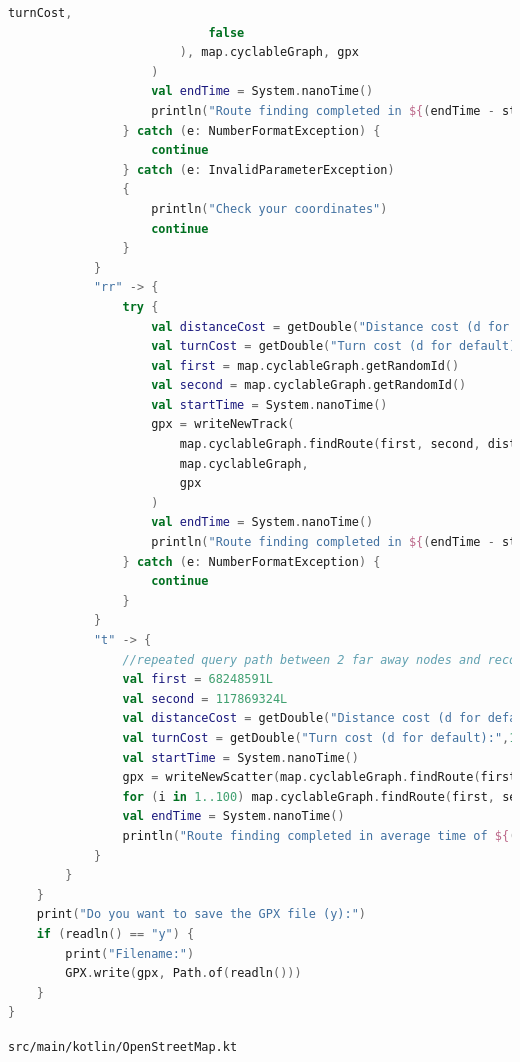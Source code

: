 \documentclass[11pt,twoside,a4paper]{report}
\begin{document}
\begin{lstlisting}[language=kotlin]
                            turnCost,
                            false
                        ), map.cyclableGraph, gpx
                    )
                    val endTime = System.nanoTime()
                    println("Route finding completed in ${(endTime - startTime) / (1000000000.0)}")
                } catch (e: NumberFormatException) {
                    continue
                } catch (e: InvalidParameterException)
                {
                    println("Check your coordinates")
                    continue
                }
            }
            "rr" -> {
                try {
                    val distanceCost = getDouble("Distance cost (d for default):",15.0)
                    val turnCost = getDouble("Turn cost (d for default):",10.0)
                    val first = map.cyclableGraph.getRandomId()
                    val second = map.cyclableGraph.getRandomId()
                    val startTime = System.nanoTime()
                    gpx = writeNewTrack(
                        map.cyclableGraph.findRoute(first, second, distanceCost, turnCost, false),
                        map.cyclableGraph,
                        gpx
                    )
                    val endTime = System.nanoTime()
                    println("Route finding completed in ${(endTime - startTime) / (1000000000.0)}")
                } catch (e: NumberFormatException) {
                    continue
                }
            }
            "t" -> {
                //repeated query path between 2 far away nodes and record the average time difference
                val first = 68248591L
                val second = 117869324L
                val distanceCost = getDouble("Distance cost (d for default):",15.0)
                val turnCost = getDouble("Turn cost (d for default):",15.0)
                val startTime = System.nanoTime()
                gpx = writeNewScatter(map.cyclableGraph.findRoute(first,second,distanceCost,turnCost,true),map.cyclableGraph,gpx)
                for (i in 1..100) map.cyclableGraph.findRoute(first, second, distanceCost, turnCost, false)
                val endTime = System.nanoTime()
                println("Route finding completed in average time of ${(endTime - startTime) / (1000000000.0 * 100.0)}")
            }
        }
    }
    print("Do you want to save the GPX file (y):")
    if (readln() == "y") {
        print("Filename:")
        GPX.write(gpx, Path.of(readln()))
    }
} 
\end{lstlisting}
\texttt{src/main/kotlin/OpenStreetMap.kt}
\end{document}
